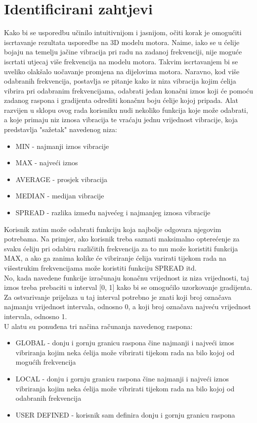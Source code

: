 \documentclass[times, utf8, diplomski]{fer}
\begin{document}
\section{Identificirani zahtjevi}
Kako bi se usporedbu učinilo intuitivnijom i jasnijom, očiti korak je omogućiti iscrtavanje rezultata usporedbe na 3D modelu motora. Naime, iako se u \citep{matkovic2021getting} ćelije bojaju na temelju jačine vibracija pri radu na zadanoj frekvenciji, nije moguće iscrtati utjecaj više frekvencija na modelu motora. Takvim iscrtavanjem bi se uveliko olakšalo uočavanje promjena na dijelovima motora. Naravno, kod više odabranih frekvencija, postavlja se pitanje kako iz niza vibracija kojim ćelija vibrira pri odabranim frekvencijama, odabrati jedan konačni iznos koji će pomoću zadanog raspona i gradijenta odrediti konačnu boju ćelije kojoj pripada. Alat razvijen u sklopu ovog rada korisniku nudi nekoliko funkcija koje može odabrati, a koje primaju niz iznosa vibracija te vraćaju jednu vrijednost vibracije, koja predstavlja "sažetak" navedenog niza:

\begin{itemize}
\item MIN - najmanji iznos vibracije
\item MAX - najveći iznos 
\item AVERAGE - prosjek vibracija
\item MEDIAN - medijan vibracije
\item SPREAD - razlika između najvećeg i najmanjeg iznosa vibracije\\
\end{itemize}
Korisnik zatim može odabrati funkciju koja najbolje odgovara njegovim potrebama. Na primjer, ako korisnik treba saznati maksimalno opterećenje za svaku ćeliju pri odabiru različitih frekvencija za to mu može koristiti funkcija MAX, a ako ga zanima kolike će vibriranje ćelija varirati tijekom rada na višestrukim frekvencijama može koristiti funkciju SPREAD itd.
\\
No, kada navedene funkcije izračunaju konačnu vrijednost iz niza vrijednosti, taj iznos treba prebaciti u interval [0, 1] kako bi se omogućilo uzorkovanje gradijenta. Za ostvarivanje prijelaza u taj interval potrebno je znati koji broj označava najmanju vrijednost intervala, odnosno 0, a koji broj označava najveću vrijednost intervala, odnosno 1.
\\U alatu su ponuđena tri načina računanja navedenog raspona:

\begin{itemize}
\item GLOBAL - donju i gornju granicu raspona čine najmanji i najveći iznos vibriranja kojim neka ćelija može vibrirati tijekom rada na bilo kojoj od mogućih frekvencija
\item LOCAL - donju i gornju granicu raspona čine najmanji i najveći iznos vibriranja kojim neka ćelija može vibrirati tijekom rada na bilo kojoj od odabranih frekvencija
\item USER DEFINED - korisnik sam definira donju i gornju granicu raspona\\
\end{itemize}
\end{document}
